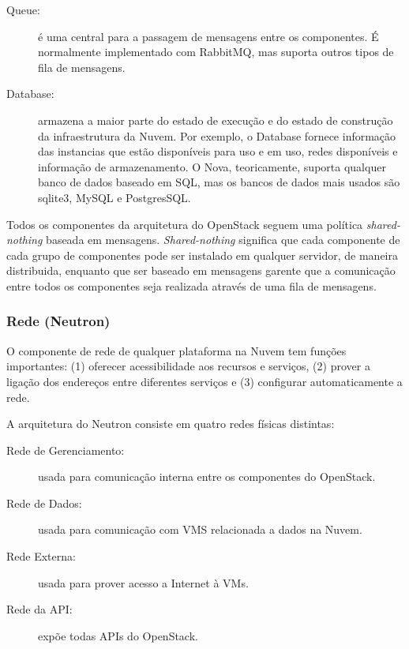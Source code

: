 \begin{description}
	\item[Queue:] é uma central para a passagem de mensagens entre os componentes. É normalmente implementado com RabbitMQ, mas suporta outros tipos de fila de mensagens.

	\item[Database:] armazena a maior parte do estado de execução e do estado de construção da infraestrutura da Nuvem. Por exemplo, o Database fornece informação das instancias que estão disponíveis para uso e em uso, redes disponíveis e informação de armazenamento. O Nova, teoricamente, suporta qualquer banco de dados baseado em SQL, mas os bancos de dados mais usados são sqlite3, MySQL e PostgresSQL.

\end{description}

Todos os componentes da arquitetura do OpenStack seguem uma política \textit{shared-nothing} baseada em mensagens. \textit{Shared-nothing} significa que cada componente de cada grupo de componentes pode ser instalado em qualquer servidor, de maneira distribuida, enquanto que ser baseado em mensagens garente que a comunicação entre todos os componentes seja realizada através de uma fila de mensagens. 

\subsubsection{Rede (Neutron)}

O componente de rede de qualquer plataforma na Nuvem tem funções importantes: (1) oferecer acessibilidade aos recursos e serviços, (2) prover a ligação dos endereços entre diferentes serviços e (3) configurar automaticamente a rede.

A arquitetura do Neutron consiste em quatro redes físicas distintas:

\begin{description}

	\item[Rede de Gerenciamento:] usada para comunicação interna entre os componentes do OpenStack. 

	\item[Rede de Dados:] usada para comunicação com VMS relacionada a dados na Nuvem.

	\item[Rede Externa:] usada para prover acesso a Internet à VMs.

	\item[Rede da API:] expõe todas APIs do OpenStack.

\end{description}


